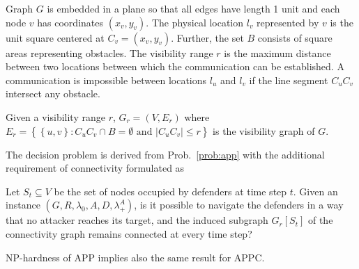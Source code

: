 Graph $G$ is embedded in a plane so that all edges have length 1 unit and each node $v$ has coordinates $(x_v,y_v)$.
The physical location $l_v$ represented by $v$ is the unit square centered at $C_v=(x_v,y_v)$.
Further, the set $B$ consists of square areas representing obstacles.
The visibility range $r$ is the maximum distance between two locations between which the communication can be established.
A communication is impossible between locations $l_u$ and $l_v$ if the line segment $C_uC_v$ intersect any obstacle. 
\begin{definition}
	Given a visibility range $r$, $G_r=(V,E_r)$ where \newline
	$E_r=\left\{\left\{u,v\right\}:C_uC_v\cap B=\emptyset\text{ and } |C_uC_v|\leq r\right\}$ is the visibility graph of $G$.
\end{definition}

The decision problem is derived from Prob.~\ref{prob:app} with the additional requirement of connectivity formulated as
\begin{problem}
	Let $S_t\subseteq V$ be the set of nodes occupied by defenders at time step $t$.
	Given an instance $(G,R,\lambda_0,A, D, \lambda_+^A)$, is it possible to navigate the defenders in a way that no attacker reaches its target,
	and the induced subgraph $G_r\left[S_t\right]$ of the connectivity graph remains connected at every time step?
\end{problem}
NP-hardness of APP implies also the same result for APPC.
